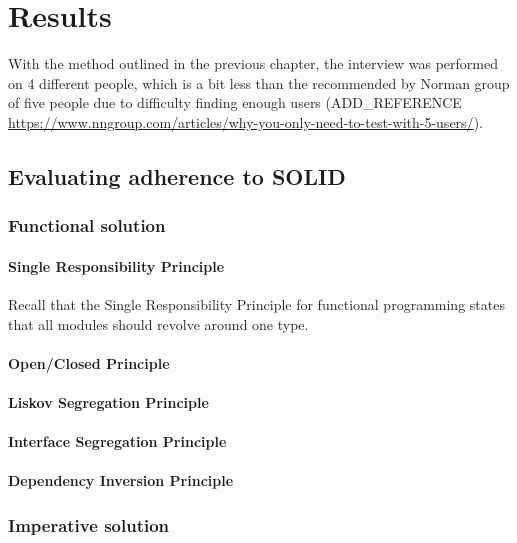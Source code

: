 \chapter{Results}\label{results}

With the method outlined in the previous chapter, the interview was performed on
4 different people, which is a bit less than the recommended by Norman group of
five people due to difficulty finding enough users
(ADD\_REFERENCE \url{https://www.nngroup.com/articles/why-you-only-need-to-test-with-5-users/}).

\section{Evaluating adherence to SOLID}

\subsection{Functional solution}
\subsubsection{Single Responsibility Principle}

Recall that the Single Responsibility Principle for functional programming
states that all modules should revolve around one type. 

\subsubsection{Open/Closed Principle}

\subsubsection{Liskov Segregation Principle}

\subsubsection{Interface Segregation Principle}

\subsubsection{Dependency Inversion Principle}

\subsection{Imperative solution}

